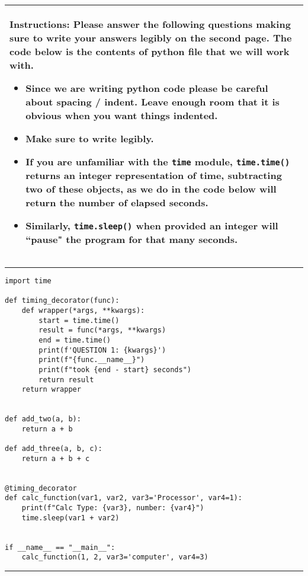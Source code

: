 \documentclass[11pt]{article}
\begin{document}
\begin{table}[h]
\centering
{} %
\begin{tabular}{|p{\textwidth}|}
\hline
\begin{minipage}[t]{\textwidth}
\vspace{0pt}  %
\noindent \textbf{Instructions:} Please answer the following questions making sure to write your answers legibly on the second page. The code below is the contents of python file that we will work with.
\begin{itemize}
\item Since we are writing python code please be careful about spacing / indent. Leave enough room that it is obvious when you want things indented. 
\item Make sure to write legibly.
\item If you are unfamiliar with the \texttt{time} module, \texttt{time.time()} returns an integer representation of time, subtracting two of these objects, as we do in the code below will return the number of elapsed seconds.
\item Similarly, \texttt{time.sleep()} when provided an integer will ``pause" the program for that many seconds.
\end{itemize}
\end{minipage} 
\\
\hline
\end{tabular}
\end{table}

{\color{lightgray}\hrule}
\begin{verbatim}
import time
	
def timing_decorator(func):
    def wrapper(*args, **kwargs):
        start = time.time()
        result = func(*args, **kwargs)
        end = time.time()
        print(f'QUESTION 1: {kwargs}')
        print(f"{func.__name__}")
        print(f"took {end - start} seconds")
        return result
    return wrapper
    

def add_two(a, b):
    return a + b

def add_three(a, b, c):
    return a + b + c


@timing_decorator
def calc_function(var1, var2, var3='Processor', var4=1):
    print(f"Calc Type: {var3}, number: {var4}")
    time.sleep(var1 + var2)
    
    
if __name__ == "__main__":
    calc_function(1, 2, var3='computer', var4=3)

\end{verbatim}
{\color{lightgray}\hrule}
\end{document}
